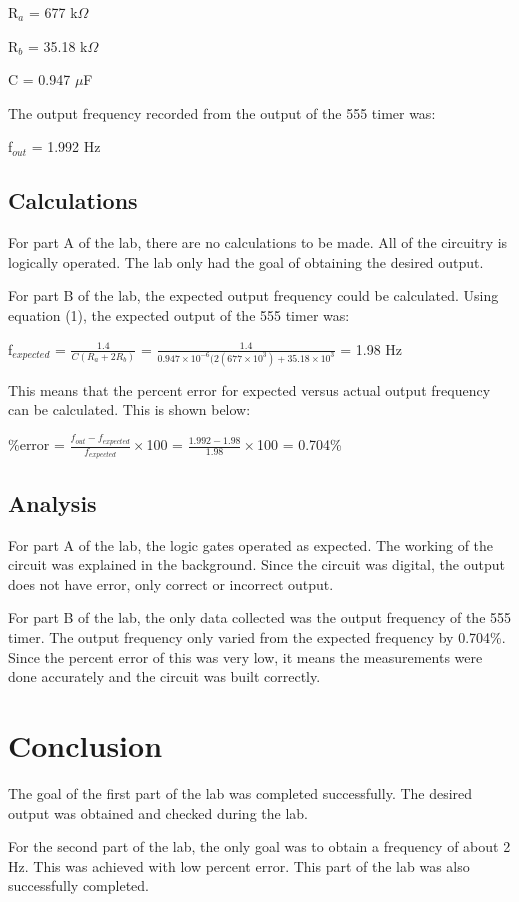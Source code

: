 \documentclass[twocolumn, amsmath]{revtex4}
\begin{document}
R$_a$ = 677 k$\Omega$

R$_b$ = 35.18 k$\Omega$

C = 0.947 $\mu$F

The output frequency recorded from the output of the 555 timer was:

f$_{out}$ = 1.992 Hz

\subsection{Calculations}
For part A of the lab, there are no calculations to be made. All of the circuitry is logically operated. The lab only had the goal of obtaining the desired output.

For part B of the lab, the expected output frequency could be calculated. %
Using equation (1), the expected output of the 555 timer was:

f$_{expected}$ = $\frac{1.4}{C(R_a + 2R_b)}$ = $\frac{1.4}{0.947\times 10^{-6}(2(677\times 10^3) + 35.18\times 10^3}$ = 1.98 Hz

This means that the percent error for expected versus actual output frequency can be calculated. This is shown below:

\%error = $\frac{f_{out} - f_{expected}}{f_{expected}}\times$100 = $\frac{1.992 - 1.98}{1.98}\times$100 = 0.704\%

\subsection{Analysis}
For part A of the lab, the logic gates operated as expected. The working of the circuit was explained in the background. Since the circuit was digital, the output does not have error, only correct or incorrect output.

For part B of the lab, the only data collected was the output frequency of the 555 timer. The output frequency only varied from the expected frequency by 0.704\%. Since the percent error of this was very low, it means the measurements were done accurately and the circuit was built correctly.





\section{Conclusion}
The goal of the first part of the lab was completed successfully. The desired output was obtained and checked during the lab.

For the second part of the lab, the only goal was to obtain a frequency of about 2 Hz. This was achieved with low percent error. This part of the lab was also successfully completed.
\end{document}
